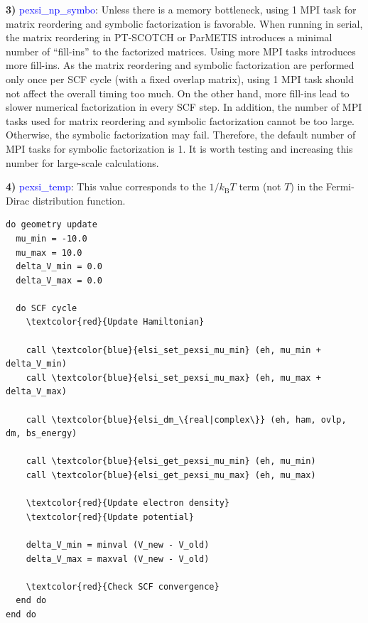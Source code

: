 \documentclass{report}
\begin{document}
\textbf{3)} \textcolor{blue}{pexsi\_np\_symbo}: Unless there is a memory bottleneck, using 1 MPI task for matrix reordering and symbolic factorization is favorable. When running in serial, the matrix reordering in PT-SCOTCH or ParMETIS introduces a minimal number of ``fill-ins'' to the factorized matrices. Using more MPI tasks introduces more fill-ins. As the matrix reordering and symbolic factorization are performed only once per SCF cycle (with a fixed overlap matrix), using 1 MPI task should not affect the overall timing too much. On the other hand, more fill-ins lead to slower numerical factorization in every SCF step. In addition, the number of MPI tasks used for matrix reordering and symbolic factorization cannot be too large. Otherwise, the symbolic factorization may fail. Therefore, the default number of MPI tasks for symbolic factorization is 1. It is worth testing and increasing this number for large-scale calculations.

\textbf{4)} \textcolor{blue}{pexsi\_temp}: This value corresponds to the $1/k_\text{B} T$ term (not $T$) in the Fermi-Dirac distribution function.

\begin{tcolorbox}
\begin{Verbatim}[commandchars=\\\{\}]
do geometry update
  mu_min = -10.0
  mu_max = 10.0
  delta_V_min = 0.0
  delta_V_max = 0.0

  do SCF cycle
    \textcolor{red}{Update Hamiltonian}

    call \textcolor{blue}{elsi_set_pexsi_mu_min} (eh, mu_min + delta_V_min)
    call \textcolor{blue}{elsi_set_pexsi_mu_max} (eh, mu_max + delta_V_max)

    call \textcolor{blue}{elsi_dm_\{real|complex\}} (eh, ham, ovlp, dm, bs_energy)

    call \textcolor{blue}{elsi_get_pexsi_mu_min} (eh, mu_min)
    call \textcolor{blue}{elsi_get_pexsi_mu_max} (eh, mu_max)

    \textcolor{red}{Update electron density}
    \textcolor{red}{Update potential}

    delta_V_min = minval (V_new - V_old)
    delta_V_max = maxval (V_new - V_old)

    \textcolor{red}{Check SCF convergence}
  end do
end do
\end{Verbatim}
\end{tcolorbox}
\end{document}
